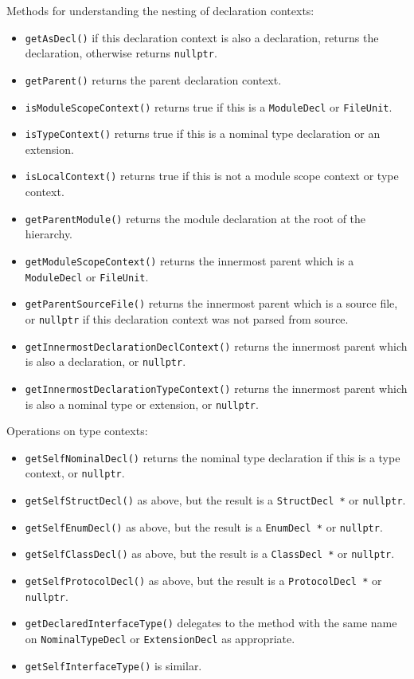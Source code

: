 \documentclass[../generics]{subfiles}
\begin{document}
Methods for understanding the nesting of declaration contexts:
\begin{itemize}
\item \texttt{getAsDecl()} if this declaration context is also a declaration, returns the declaration, otherwise returns \texttt{nullptr}.
\item \texttt{getParent()} returns the parent declaration context.
\item \texttt{isModuleScopeContext()} returns true if this is a \texttt{ModuleDecl} or \texttt{FileUnit}.
\item \texttt{isTypeContext()} returns true if this is a nominal type declaration or an extension.
\item \texttt{isLocalContext()} returns true if this is not a module scope context or type context.
\item \texttt{getParentModule()} returns the module declaration at the root of the hierarchy.
\item \texttt{getModuleScopeContext()} returns the innermost parent which is a \texttt{ModuleDecl} or \texttt{FileUnit}.
\item \texttt{getParentSourceFile()} returns the innermost parent which is a source file, or \texttt{nullptr} if this declaration context was not parsed from source.
\item \texttt{getInnermostDeclarationDeclContext()} returns the innermost parent which is also a declaration, or \texttt{nullptr}.
\item \texttt{getInnermostDeclarationTypeContext()} returns the innermost parent which is also a nominal type or extension, or \texttt{nullptr}.
\end{itemize}
Operations on type contexts:
\begin{itemize}
\item \texttt{getSelfNominalDecl()} returns the nominal type declaration if this is a type context, or \texttt{nullptr}.
\item \texttt{getSelfStructDecl()} as above, but the result is a \texttt{StructDecl *} or \texttt{nullptr}.
\item \texttt{getSelfEnumDecl()} as above, but the result is a \texttt{EnumDecl *} or \texttt{nullptr}.
\item \texttt{getSelfClassDecl()} as above, but the result is a \texttt{ClassDecl *} or \texttt{nullptr}.
\item \texttt{getSelfProtocolDecl()} as above, but the result is a \texttt{ProtocolDecl *} or \texttt{nullptr}.
\item \texttt{getDeclaredInterfaceType()} delegates to the method with the same name on \texttt{NominalTypeDecl} or \texttt{ExtensionDecl} as appropriate.
\item \texttt{getSelfInterfaceType()} is similar.
\end{itemize}
\end{document}
